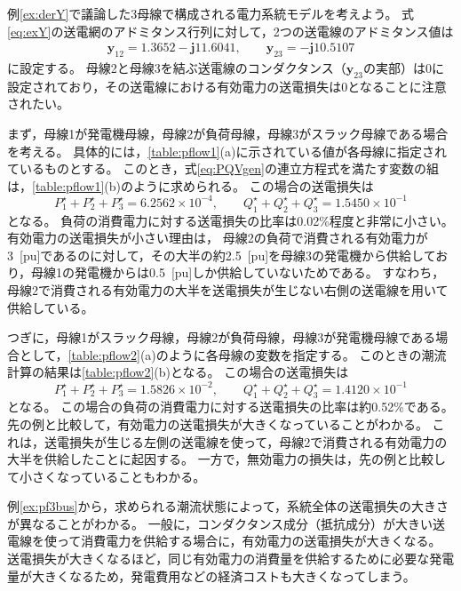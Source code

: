 \documentclass[tombow,dvipdfmx]{corona-a5-1.1}
\begin{document}
\begin{例}[データシートに基づく潮流計算]\label{ex:pf3bus}
例\ref{ex:derY}で議論した3母線で構成される電力系統モデルを考えよう。
式\ref{eq:exY}の送電網のアドミタンス行列に対して，2つの送電線のアドミタンス値は
\begin{align}\label{eq:rightlossless}
\bm{y}_{12} = 1.3652 - \bm{j} 11.6041, \qquad
\bm{y}_{23} =  - \bm{j} 10.5107
\end{align}
に設定する。
母線2と母線3を結ぶ送電線のコンダクタンス（$\bm{y}_{23}$の実部）は0に設定されており，その送電線における有効電力の送電損失は0となることに注意されたい。

まず，母線1が発電機母線，母線2が負荷母線，母線3がスラック母線である場合を考える。
具体的には，\ref{table:pflow1}(a)に示されている値が各母線に指定されているものとする。
このとき，式\ref{eq:PQVgen}の連立方程式を満たす変数の組は，\ref{table:pflow1}(b)のように求められる。
この場合の送電損失は
\[
P_1^{\star} + P_2^{\star} + P_3^{\star} = 6.2562\times 10^{-4},
\qquad 
Q_1^{\star} + Q_2^{\star} + Q_3^{\star} =1.5450  \times 10^{-1}
\]
となる。
負荷の消費電力に対する送電損失の比率は0.02\%程度と非常に小さい。
有効電力の送電損失が小さい理由は，
母線2の負荷で消費される有効電力が3~[pu]であるのに対して，その大半の約2.5~[pu]を母線3の発電機から供給しており，母線1の発電機からは0.5~[pu]しか供給していないためである。
すなわち，母線2で消費される有効電力の大半を送電損失が生じない右側の送電線を用いて供給している。

つぎに，母線1がスラック母線，母線2が負荷母線，母線3が発電機母線である場合として，\ref{table:pflow2}(a)のように各母線の変数を指定する。
このときの潮流計算の結果は\ref{table:pflow2}(b)となる。
この場合の送電損失は
\[
P_1^{\star} + P_2^{\star} + P_3^{\star} = 1.5826 \times 10^{-2},
\qquad 
Q_1^{\star} + Q_2^{\star} + Q_3^{\star} =1.4120  \times 10^{-1}
\]
となる。
この場合の負荷の消費電力に対する送電損失の比率は約0.52\%である。
先の例と比較して，有効電力の送電損失が大きくなっていることがわかる。
これは，送電損失が生じる左側の送電線を使って，母線2で消費される有効電力の大半を供給したことに起因する。
一方で，無効電力の損失は，先の例と比較して小さくなっていることもわかる。
\end{例}

例\ref{ex:pf3bus}から，求められる潮流状態によって，系統全体の送電損失の大きさが異なることがわかる。
一般に，コンダクタンス成分（抵抗成分）が大きい送電線を使って消費電力を供給する場合に，有効電力の送電損失が大きくなる。
送電損失が大きくなるほど，同じ有効電力の消費量を供給するために必要な発電量が大きくなるため，発電費用などの経済コストも大きくなってしまう。
\end{document}
